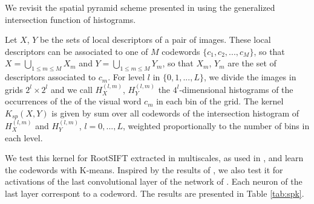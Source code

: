 We revisit the spatial pyramid scheme presented in \cite{spk} using the generalized intersection function of histograms. 

Let $X$, $Y$ be the sets of local descriptors of a pair of images. 
These local descriptors can be associated to one of $M$ codewords $\{c_1,c_2,...,c_M\}$, so that $X=\bigcup_{1\leq m \leq M}X_m$ and $Y=\bigcup_{1\leq m \leq M}Y_m$, so that $X_m$, $Y_m$ are the set of descriptors associated to $c_m$. 
For level $l$ in $\{0,1,..., L\}$, we divide the images in grids $2^l\times 2^l$ and we call $H^{(l,m)}_X$, $H^{(l,m)}_Y$ the $4^l$-dimensional histograms of the occurrences of the of the visual word $c_m$ in each bin of the grid. 
The kernel $K_{sp}(X,Y)$ is given by sum over all codewords of the intersection histogram of $H^{(l,m)}_X$ and $H^{(l,m)}_Y$, $l=0,...,L$,  weighted proportionally to the number of bins in each level.

We test this kernel for RootSIFT extracted in multiscales, as used in \cite{spk}, and learn the codewords with K-means. Inspired by the results of \cite{SPPCNN}, we also test it for activations of the last convolutional layer of the network of \cite{SimonZisser15}. Each neuron of the last layer correspont to a codeword. The results are presented in Table \ref{tab:spk}.

